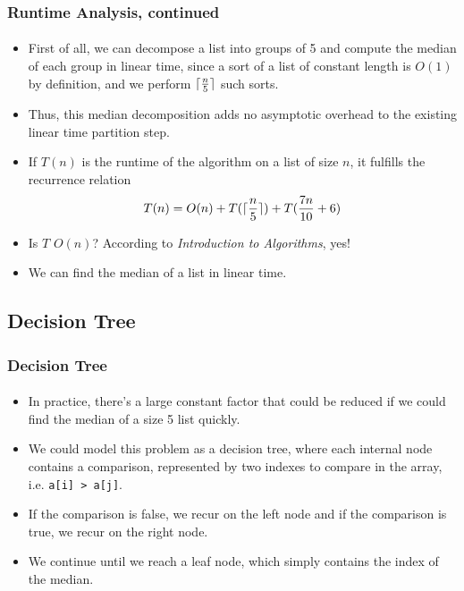 \documentclass{beamer}                             %
\DeclarePairedDelimiter\ceil{\lceil}{\rceil}
\begin{document}
\begin{frame}
\frametitle{Runtime Analysis, continued}
\framesubtitle{}
\begin{itemize}[<+->]
  \item First of all, we can decompose a list into groups of 5
    and compute the median of each group in linear time, since a
    sort of a list of constant length is \( O(1) \) by definition,
    and we perform \( \ceil{\frac{n}{5}} \) such sorts.
  \item Thus, this median decomposition adds no asymptotic
    overhead to the existing linear time partition step.
  \item If \( T(n) \) is the runtime of the algorithm on a list
    of size \( n \), it fulfills the recurrence relation
    \[ T(n) = O(n) + T(\ceil{\frac{n}{5}}) + T(\frac{7n}{10} + 6) \]
  \item Is \( T \) \( O(n) \)?
    According to \textit{Introduction to Algorithms}, yes!
  \item We can find the median of a list in linear time.
\end{itemize}
\end{frame}

\subsection{Decision Tree}

\begin{frame}
\frametitle{Decision Tree}
\framesubtitle{}
\begin{itemize}[<+->]
  \item In practice, there's a large constant factor that could be
    reduced if we could find the median of a size 5 list quickly.
  \item We could model this problem as a \alert{decision tree}, where
    each internal node contains a comparison, represented by two indexes
    to compare in the array, i.e. \texttt{a[i] > a[j]}.
  \item If the comparison is false, we recur on the left node
    and if the comparison is true, we recur on the right node.
  \item We continue until we reach a leaf node,
    which simply contains the index of the median.
\end{itemize}
\end{frame}
\end{document}
